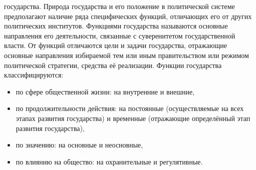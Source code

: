 \documentclass[12pt]{article}
\begin{document}
государства.
Природа государства и его положение в политической системе предполагают наличие ряда специфических
функций, отличающих его от других политических институтов. Функциями государства называются основные
направления его деятельности, связанные с суверенитетом государственной власти. От функций отличаются
цели и задачи государства, отражающие основные направления избираемой тем или иным правительством или
режимом политической стратегии, средства её реализации.
Функции государства классифицируются:
\begin{itemize}
  \item по сфере общественной жизни: на внутренние и внешние,
 \item по продолжительности действия: на постоянные (осуществляемые на всех этапах развития государства) и
временные (отражающие определённый этап развития государства),
\item по значению: на основные и неосновные,
\item по влиянию на общество: на охранительные и регулятивные.
\end{itemize}
  
\end{document}
